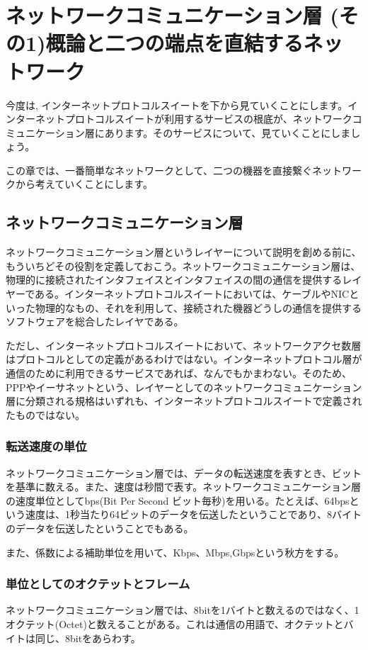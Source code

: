 \chapter{ネットワークコミュニケーション層 (その1)概論と二つの端点を直結するネットワーク}

今度は,
インターネットプロトコルスイートを下から見ていくことにします。インターネットプロトコルスイートが利用するサービスの根底が、ネットワークコミュニケーション層にあります。そのサービスについて、見ていくことにしましょう。

この章では、一番簡単なネットワークとして、二つの機器を直接繋ぐネットワークから考えていくことにします。


\section{ネットワークコミュニケーション層}
ネットワークコミュニケーション層というレイヤーについて説明を創める前に、もういちどその役割を定義しておこう。ネットワークコミュニケーション層は、物理的に接続されたインタフェイスとインタフェイスの間の通信を提供するレイヤーである。インターネットプロトコルスイートにおいては、ケーブルやNICといった物理的なもの、それを利用して、接続された機器どうしの通信を提供するソフトウェアを総合したレイヤである。

ただし、インターネットプロトコルスイートにおいて、ネットワークアクセ数層はプロトコルとしての定義があるわけではない。インターネットプロトコル層が通信のために利用できるサービスであれば、なんでもかまわない。そのため、PPPやイーサネットという、レイヤーとしてのネットワークコミュニケーション層に分類される規格はいずれも、インターネットプロトコルスイートで定義されたものではない。

\subsection{転送速度の単位}
ネットワークコミュニケーション層では、データの転送速度を表すとき、ビットを基準に数える。また、速度は秒間で表す。ネットワークコミュニケーション層の速度単位としてbps(Bit Per Second ビット毎秒)を用いる。たとえば、64bpsという速度は、1秒当たり64ビットのデータを伝送したということであり、8バイトのデータを伝送したということでもある。

また、係数による補助単位を用いて、Kbps、Mbps,Gbpsという秋方をする。


\subsection{単位としてのオクテットとフレーム}
ネットワークコミュニケーション層では、8bitを1バイトと数えるのではなく、1オクテット(Octet)と数えることがある。これは通信の用語で、オクテットとバイトは同じ、8bitをあらわす。

